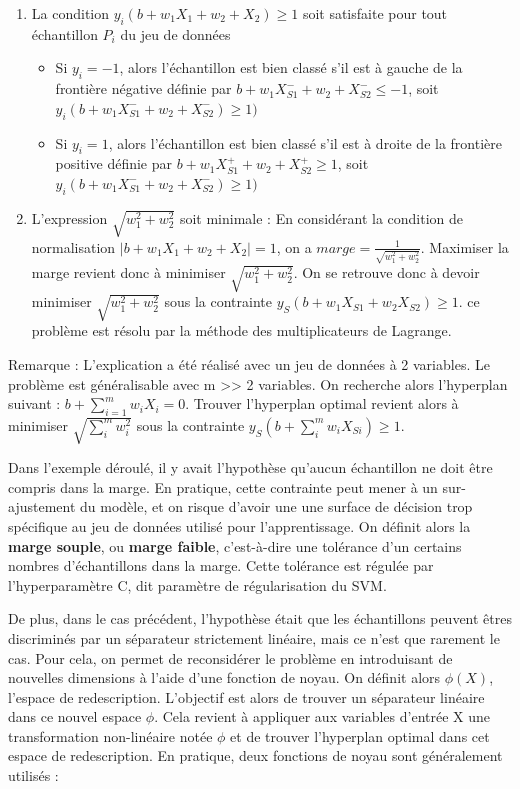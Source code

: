 \documentclass[
]{article}
\begin{document}
\begin{enumerate}
\def\labelenumi{\arabic{enumi}.}
\item
  La condition \(y_i(b+w_1X_1+w_2+X_2) \geq 1\) soit satisfaite pour
  tout échantillon \(P_i\) du jeu de données

  \begin{itemize}
  \item
    Si \(y_i=-1\), alors l'échantillon est bien classé s'il est à gauche
    de la frontière négative définie par
    \(b+w_1X_{S1}^{-}+w_2+X_{S2}^{-} \leq -1\), soit
    \(y_i(b+w_1X_{S1}^{-}+w_2+X_{S2}^{-}) \geq 1)\)
  \item
    Si \(y_i=1\), alors l'échantillon est bien classé s'il est à droite
    de la frontière positive définie par
    \(b+w_1X_{S1}^{+}+w_2+X_{S2}^{+} \geq 1\), soit
    \(y_i(b+w_1X_{S1}^{-}+w_2+X_{S2}^{-}) \geq 1)\)
  \end{itemize}
\item
  L'expression \(\sqrt{w_1^2+w_2^2}\) soit minimale : En considérant la
  condition de normalisation \(|b+w_1X_1+w_2+X_2| = 1\), on a
  \(marge = \frac{1}{\sqrt{w_1^2+w_2^2}}\). Maximiser la marge revient
  donc à minimiser \(\sqrt{w_1^2+w_2^2}\). On se retrouve donc à devoir
  minimiser \(\sqrt{w_1^2+w_2^2}\) sous la contrainte
  \(y_S (b+w_1X_{S1}+w_2X_{S2}) \geq 1\). ce problème est résolu par la
  méthode des multiplicateurs de Lagrange.
\end{enumerate}

Remarque : L'explication a été réalisé avec un jeu de données à 2
variables. Le problème est généralisable avec m
\textgreater\textgreater{} 2 variables. On recherche alors l'hyperplan
suivant : \(b+\sum_{i=1}^mw_iX_i=0\). Trouver l'hyperplan optimal
revient alors à minimiser \(\sqrt{\sum_i^mw_i^2}\) sous la contrainte
\(y_S(b+\sum_i^mw_iX_{Si})\geq1\).

Dans l'exemple déroulé, il y avait l'hypothèse qu'aucun échantillon ne
doit être compris dans la marge. En pratique, cette contrainte peut
mener à un sur-ajustement du modèle, et on risque d'avoir une une
surface de décision trop spécifique au jeu de données utilisé pour
l'apprentissage. On définit alors la \textbf{marge souple}, ou
\textbf{marge faible}, c'est-à-dire une tolérance d'un certains nombres
d'échantillons dans la marge. Cette tolérance est régulée par
l'hyperparamètre C, dit paramètre de régularisation du SVM.

De plus, dans le cas précédent, l'hypothèse était que les échantillons
peuvent êtres discriminés par un séparateur strictement linéaire, mais
ce n'est que rarement le cas. Pour cela, on permet de reconsidérer le
problème en introduisant de nouvelles dimensions à l'aide d'une fonction
de noyau. On définit alors \(\phi(X)\), l'espace de redescription.
L'objectif est alors de trouver un séparateur linéaire dans ce nouvel
espace \(\phi\). Cela revient à appliquer aux variables d'entrée X une
transformation non-linéaire notée \(\phi\) et de trouver l'hyperplan
optimal dans cet espace de redescription. En pratique, deux fonctions de
noyau sont généralement utilisés :
\end{document}
